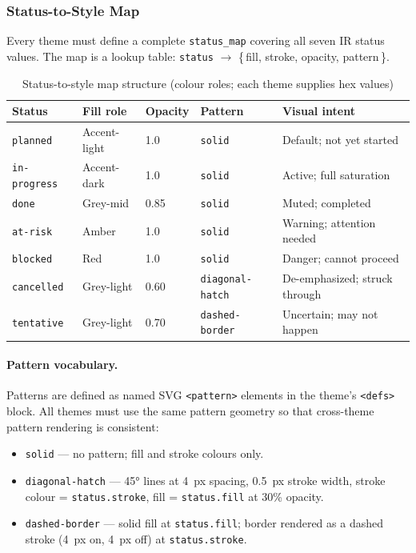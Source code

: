 \subsubsection{Status-to-Style Map}
\label{sec:status-style-map}

Every theme must define a complete \texttt{status\_map} covering all seven IR status values.
The map is a lookup table: \texttt{status} $\to$ \{\,fill, stroke, opacity, pattern\,\}.

\begin{table}[h]
\centering
\small
\begin{tabular}{llllp{3.8cm}}
\toprule
\textbf{Status} & \textbf{Fill role} & \textbf{Opacity} & \textbf{Pattern} & \textbf{Visual intent} \\
\midrule
\texttt{planned}     & Accent-light  & 1.0  & \texttt{solid}          & Default; not yet started \\
\texttt{in-progress} & Accent-dark   & 1.0  & \texttt{solid}          & Active; full saturation \\
\texttt{done}        & Grey-mid      & 0.85 & \texttt{solid}          & Muted; completed \\
\texttt{at-risk}     & Amber         & 1.0  & \texttt{solid}          & Warning; attention needed \\
\texttt{blocked}     & Red           & 1.0  & \texttt{solid}          & Danger; cannot proceed \\
\texttt{cancelled}   & Grey-light    & 0.60 & \texttt{diagonal-hatch} & De-emphasized; struck through \\
\texttt{tentative}   & Grey-light    & 0.70 & \texttt{dashed-border}  & Uncertain; may not happen \\
\bottomrule
\end{tabular}
\caption{Status-to-style map structure (colour roles; each theme supplies hex values)}
\label{tab:status-style}
\end{table}

\paragraph{Pattern vocabulary.}
Patterns are defined as named SVG \texttt{<pattern>} elements in the theme's \texttt{<defs>}
block. All themes must use the same pattern geometry so that cross-theme pattern rendering
is consistent:
\begin{itemize}
  \item \texttt{solid} --- no pattern; fill and stroke colours only.
  \item \texttt{diagonal-hatch} --- 45° lines at 4~px spacing, 0.5~px stroke width,
        stroke colour = \texttt{status.stroke}, fill = \texttt{status.fill} at 30\% opacity.
  \item \texttt{dashed-border} --- solid fill at \texttt{status.fill}; border rendered as a
        dashed stroke (4~px on, 4~px off) at \texttt{status.stroke}.
\end{itemize}

